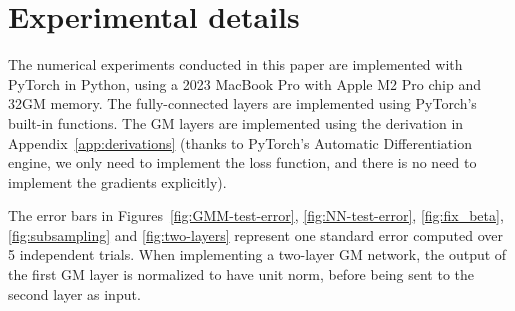 \documentclass{custom}
\begin{document}
\section{Experimental details}


The numerical experiments conducted in this paper are implemented with PyTorch in Python, using a 2023 MacBook Pro with Apple M2 Pro chip and 32GM memory. The fully-connected layers are implemented using PyTorch's built-in functions. The GM layers are implemented using the derivation in Appendix~\ref{app:derivations} (thanks to PyTorch's Automatic Differentiation engine, we only need to implement the loss function, and there is no need to implement the gradients explicitly).

The error bars in Figures~\ref{fig:GMM-test-error}, \ref{fig:NN-test-error}, \ref{fig:fix_beta}, \ref{fig:subsampling} and \ref{fig:two-layers} represent one standard error computed over 5 independent trials. When implementing a two-layer GM network, the output of the first GM layer is normalized to have unit norm, before being sent to the second layer as input.
\end{document}

